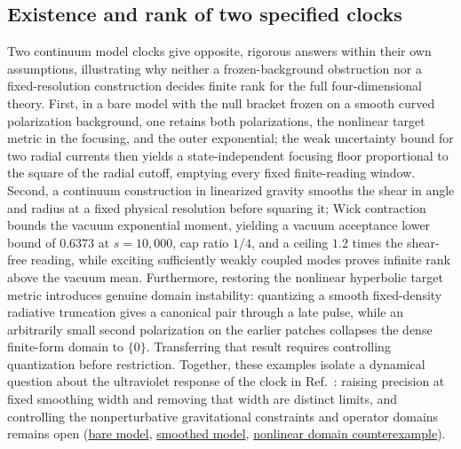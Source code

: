 \documentclass[10pt,a4paper]{article}
\numberwithin{equation}{section}
\newcommand{\repo}[2]{\href{https://github.com/sprajs/quantum-gravity/blob/main/#1}{#2}}
\begin{document}
\subsection{Existence and rank of two specified clocks}
Two continuum model clocks give opposite, rigorous answers within their own assumptions, illustrating why neither a frozen-background obstruction nor a fixed-resolution construction decides finite rank for the full four-dimensional theory. First, in a bare model with the null bracket frozen on a smooth curved polarization background, one retains both polarizations, the nonlinear target metric in the focusing, and the outer exponential; the weak uncertainty bound for two radial currents then yields a state-independent focusing floor proportional to the square of the radial cutoff, emptying every fixed finite-reading window. Second, a continuum construction in linearized gravity smooths the shear in angle and radius at a fixed physical resolution before squaring it; Wick contraction bounds the vacuum exponential moment, yielding a vacuum acceptance lower bound of $0.6373$ at $s=10{,}000$, cap ratio $1/4$, and a ceiling $1.2$ times the shear-free reading, while exciting sufficiently weakly coupled modes proves infinite rank above the vacuum mean. Furthermore, restoring the nonlinear hyperbolic target metric introduces genuine domain instability: quantizing a smooth fixed-density radiative truncation gives a canonical pair through a late pulse, while an arbitrarily small second polarization on the earlier patches collapses the dense finite-form domain to $\{0\}$. Transferring that result requires controlling quantization before restriction. Together, these examples isolate a dynamical question about the ultraviolet response of the clock in Ref.~\cite{Chandrasekaran2026}: raising precision at fixed smoothing width and removing that width are distinct limits, and controlling the nonperturbative gravitational constraints and operator domains remains open (\repo{audit/clock-spectrum.md}{bare model}, \repo{audit/clock-construction.md}{smoothed model}, \repo{audit/clock-domain-jump.md}{nonlinear domain counterexample}).
\end{document}
